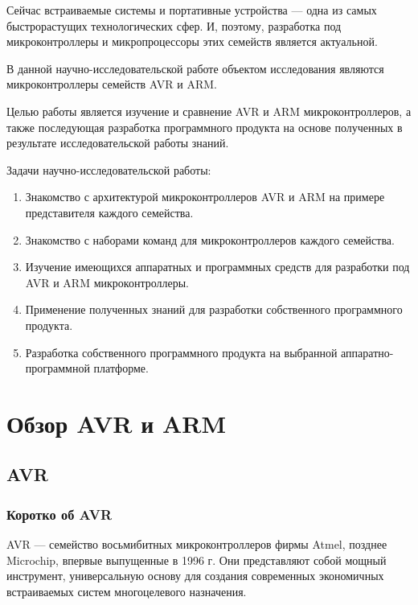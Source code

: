 \documentclass[12pt, oneside]{altsu-report}
\begin{document}
Сейчас встраиваемые системы и портативные устройства --- одна из самых быстрорастущих технологических сфер. И, поэтому, разработка под микроконтроллеры и микропроцессоры этих семейств является актуальной. 

В данной научно-исследовательской работе объектом исследования являются микроконтроллеры семейств AVR и ARM.

Целью работы является изучение и сравнение AVR и ARM микроконтроллеров, а также последующая разработка программного продукта на основе полученных в результате исследовательской работы знаний.

Задачи научно-исследовательской работы:

\begin{enumerate}
    \item Знакомство с архитектурой микроконтроллеров AVR и ARM на примере представителя каждого семейства.
    
    \item Знакомство с наборами команд для микроконтроллеров каждого семейства.
    
    \item Изучение имеющихся аппаратных и программных средств для разработки под AVR и ARM микроконтроллеры.
    
    \item Применение полученных знаний для разработки собственного программного продукта.
    
    \item Разработка собственного программного продукта на выбранной аппаратно-программной платформе.
\end{enumerate}

\chapter{Обзор AVR и ARM}
\section{AVR}
\subsection{Коротко об AVR}

AVR --- семейство восьмибитных микроконтроллеров фирмы Atmel, позднее Mic\-rochip, впервые выпущенные в 1996 г. Они представляют собой мощный инструмент, универсальную основу для создания современных экономичных встраиваемых систем многоцелевого назначения.~\cite{kochegarov_trusov}
\end{document}

